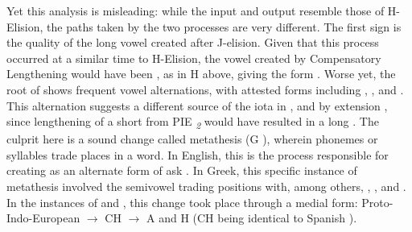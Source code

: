 Yet this analysis is misleading: while the input and output resemble those of H-Elision, the paths taken by the two processes are very different. The first sign is the quality of the long vowel created after J-elision. Given that this process occurred at a similar time to H-Elision, the vowel created by Compensatory Lengthening would have been , as in H  above, giving the form . Worse yet, the root of  shows frequent vowel alternations, with attested forms including , ,\autocite[τάνυται]{Beekes_2009} and .\autocite[τιταίνω]{Beekes_2009} This alternation suggests a different source of the iota  in , and by extension , since lengthening of a short  from PIE \textit{\textsubscript{2}} would have resulted in a long . The culprit here is a sound change called metathesis (G ), wherein phonemes or syllables trade places in a word. In English, this is the process responsible for creating  as an alternate form  of ask . In Greek, this specific instance of metathesis involved the semivowel  trading positions with,  among others, , , and . In the instances of  and , this change took place through a medial form: Proto-Indo-European  $\to$ CH  $\to$ A and H  (CH  being identical to Spanish ).

